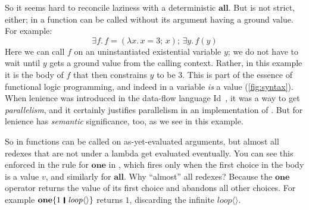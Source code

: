 \documentclass[acmsmall]{acmart}
\newcommand{\Varid}[1]{\mathit{#1}}
\begin{document}

So it seems hard to reconcile laziness with a deterministic \ensuremath{\textbf{all}}.  But \versecalc{} is not strict, either;
in \versecalc{} a function can be called without its argument having a ground value.  For example:
$$
\ensuremath{\exists\Varid{f}.\,\Varid{f}\mathrel{=}(\lambda\Varid{x}.\,\Varid{x}\mathrel{=}\mathrm{3};\,\Varid{x});\,\exists\Varid{y}.\,\Varid{f}(\Varid{y})}
$$
Here we can call \ensuremath{\Varid{f}} on an uninstantiated existential variable \ensuremath{\Varid{y}};
we do not have to wait until \ensuremath{\Varid{y}} gets a ground value from the calling context.
Rather, in this example it is the body of \ensuremath{\Varid{f}} that then constrains \ensuremath{\Varid{y}} to be \ensuremath{\mathrm{3}}.
This is part of the essence of functional logic programming, and indeed in \versecalc{} a variable \emph{is} a value
(\cref{fig:syntax}).
When lenience was introduced in the data-flow language Id~\cite{lenience}, it was a way
to get \emph{parallelism}, and it certainly justifies parallelism in an implementation of \versecalc{}.
But for \versecalc{} lenience has \emph{semantic} significance, too, as we see in this example.

So in \versecalc{} functions can be called on as-yet-evaluated arguments,
but almost all redexes that are not under a lambda get evaluated eventually.   You can see this
enforced in the rule for \ensuremath{\textbf{one}} in , which fires only when the first choice
in the body is a value $\ensuremath{\Varid{v}}$, and similarly for \ensuremath{\textbf{all}}.
Why ``almost'' all redexes? Because the \ensuremath{\textbf{one}} operator returns the value of its first choice and abandons all other choices.
For example \ensuremath{\textbf{one}\{\mathrm{1}\hspace{0.2em}\mathop{\rule[-0.1em]{0.15em}{0.75em}}\hspace{0.2em}\Varid{loop}\langle\rangle\}} returns \ensuremath{\mathrm{1}}, discarding the infinite \ensuremath{\Varid{loop}\langle\rangle}.
\end{document}
